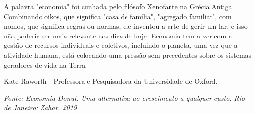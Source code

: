 \begin{knowledge}

A palavra "economia"{} foi cunhada pelo filósofo Xenofante na Grécia Antiga. Combinando oikos, que significa "casa de família"{}, "agregado familiar"{}, com nomos, que significa regras ou normas, ele inventou a arte de gerir um lar, e isso não poderia ser mais relevante nos dias de hoje. Economia tem a ver com a gestão de recursos individuais e coletivos, incluindo o planeta, uma vez que a atividade humana, está colocando uma pressão sem precedentes sobre os sistemas geradores de vida na Terra.

\vspace{1em}
Kate Raworth - Professora e Pesquisadora da Universidade de Oxford.

\textit{Fonte: Economia Donut. Uma alternativa ao crescimento a qualquer custo. Rio de Janeiro: Zahar. 2019}

\end{knowledge}

